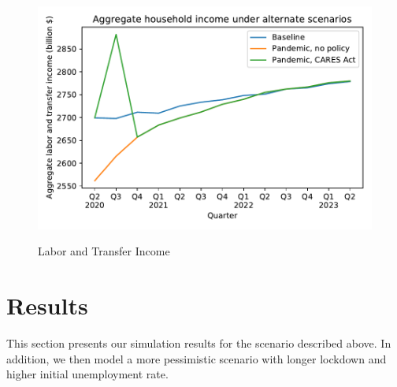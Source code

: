 \documentclass[titlepage,a4paper]{\econtex}
\begin{document}
\begin{figure}
  \centering
  \caption{Labor and Transfer Income}
  \label{labor_income}
  { \includegraphics[width=8in]{./Figures/AggLT}}
\end{figure}


\section{Results}

This section presents our simulation results for the scenario described above. In addition, we then model a more pessimistic scenario with longer lockdown and higher initial unemployment rate.
\end{document}
